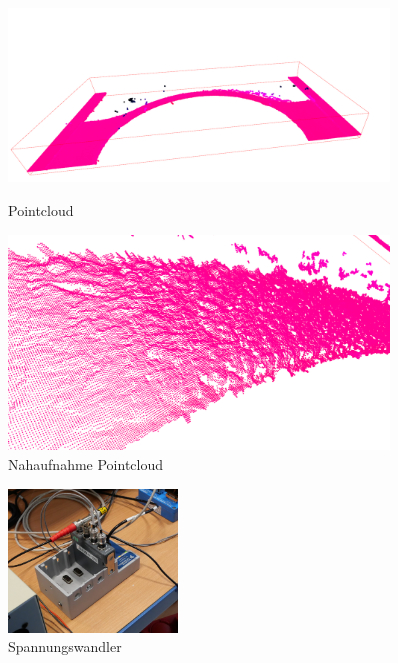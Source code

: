 \documentclass[../main.tex]{subfiles}
\begin{document}
\begin{figure}[h!]
    \centering
    \begin{minipage}{0.45\textwidth}
        \centering
        \includegraphics[width=0.9\textwidth]{images/pointcloud_big.PNG} %
        \caption{Pointcloud}
        \label{fig:pointcloud_big}
    \end{minipage}\hfill
    \begin{minipage}{0.45\textwidth}
        \centering
        \includegraphics[width=0.9\textwidth]{images/pointcloud_small.PNG} %
        \caption{Nahaufnahme Pointcloud}
        \label{fig:pointcloud_small}
    \end{minipage}
\end{figure}

\begin{figure}
    \includegraphics[width=0.4\textwidth]{images/piezoelektrische.JPG}
    \caption{Spannungswandler}
    \label{fig:piez}
\end{figure}
\end{document}
